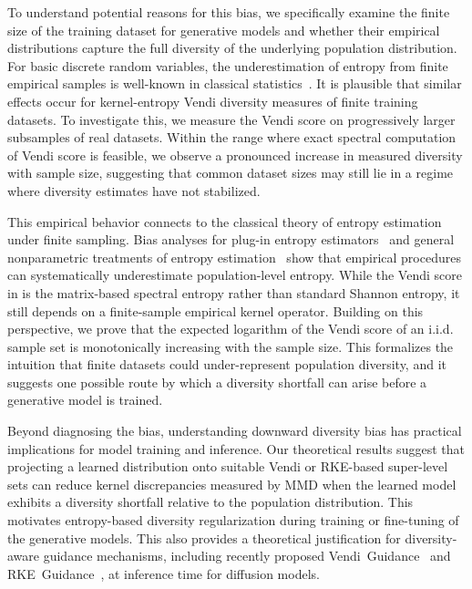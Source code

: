 \documentclass{article}
\theoremstyle{plain}
\theoremstyle{definition}
\begin{document}
To understand potential reasons for this bias, we specifically examine the finite size of the training dataset for generative models and whether their empirical distributions capture the full diversity of the underlying population distribution. For basic discrete random variables, the underestimation of entropy from finite empirical samples is well-known in classical statistics~\citep{miller1955bias,basharin1959entropy}. It is plausible that similar effects occur for kernel-entropy Vendi diversity measures of finite training datasets. To investigate this, we measure the Vendi score on progressively larger subsamples of real datasets. Within the range where exact spectral computation of Vendi score is feasible, we observe a pronounced increase in measured diversity with sample size, suggesting that common dataset sizes may still lie in a regime where diversity estimates have not stabilized.

This empirical behavior connects to the classical theory of entropy estimation under finite sampling. Bias analyses for plug-in entropy estimators~\citep{miller1955bias} and general nonparametric treatments of entropy estimation~\citep{paninski2003entropy} show that empirical procedures can systematically underestimate population-level entropy. While the Vendi score in \citep{friedman2023vendi} is the matrix-based spectral entropy rather than standard Shannon entropy, it still depends on a finite-sample empirical kernel operator. Building on this perspective, we prove that the expected logarithm of the Vendi score of an i.i.d. sample set is monotonically increasing with the sample size. This formalizes the intuition that finite datasets could under-represent population diversity, and it suggests one possible route by which a diversity shortfall can arise before a generative model is trained.

Beyond diagnosing the bias, understanding downward diversity bias has practical implications for model training and inference. Our theoretical results suggest that projecting a learned distribution onto suitable Vendi or RKE-based super-level sets can reduce kernel discrepancies measured by MMD when the learned model exhibits a diversity shortfall relative to the population distribution. This motivates entropy-based diversity regularization during training or fine-tuning of the generative models. This also provides a theoretical justification for diversity-aware guidance mechanisms, including recently proposed Vendi~Guidance~\citep{hemmat2024cvsg} and RKE~Guidance~\citep{jalali2025sparke}, at inference time for diffusion models. 
\end{document}

